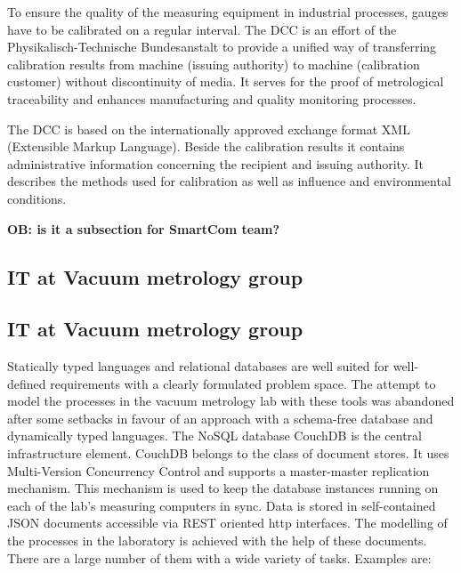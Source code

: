 \documentclass[3p,times,procedia]{elsarticle}
\begin{document}
To ensure the quality of the measuring equipment in industrial
processes, gauges have to be calibrated on a regular interval. The
DCC is an effort of the Physikalisch-Technische Bundesanstalt to provide
a unified way of transferring calibration results from machine (issuing authority) to
machine (calibration customer) without discontinuity of media. It
serves for the proof of metrological traceability and enhances 
manufacturing and quality monitoring processes.

The DCC is based on the internationally approved exchange format
XML (Extensible Markup Language). Beside the calibration results it
contains administrative information concerning the recipient and
issuing authority. It describes the methods used for calibration as well as
influence and environmental conditions.






\textbf{OB: is it a subsection for SmartCom team?}

\subsection{IT at Vacuum metrology group}

\subsection{IT at Vacuum metrology group}

Statically typed languages and relational databases are well suited
for well-defined requirements with a clearly formulated problem space.
The attempt to model the processes in the vacuum metrology lab with
these tools was abandoned after some setbacks in favour of an approach
with a schema-free database and dynamically typed languages.
The NoSQL database CouchDB \cite{couch} is the central infrastructure
element. CouchDB belongs to the class of document stores. It uses
Multi-Version Concurrency Control \cite{mvcc} and supports a master-master
replication mechanism. This mechanism is used to keep the database
instances running on each of the lab's measuring computers in sync.
Data is stored in self-contained JSON documents accessible via
REST \cite{fielding2000architectural} oriented http interfaces. The
modelling of the processes in the laboratory is achieved with the help of
these documents. There are a large number of them with a wide variety
of tasks. Examples are:
\end{document}
